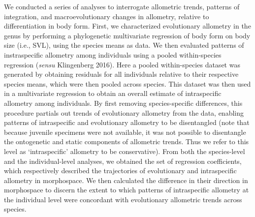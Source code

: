 \documentclass[
  11pt,
]{article}
\begin{document}
We conducted a series of analyses to interrogate allometric trends,
patterns of integration, and macroevolutionary changes in allometry,
relative to differentiation in body form. First, we characterized
evolutionary allometry in the genus by performing a phylogenetic
multivariate regression of body form on body size (i.e., SVL), using the
species means as data. We then evaluated patterns of instraspecific
allometry among individuals using a pooled within-species regression
(\emph{sensu} Klingenberg 2016). Here a pooled within-species dataset
was generated by obtaining residuals for all individuals relative to
their respective species means, which were then pooled across species.
This dataset was then used in a multivariate regression to obtain an
overall estimate of intraspecific allometry among individuals. By first
removing species-specific differences, this procedure partials out
trends of evolutionary allometry from the data, enabling patterns of
intraspecific and evolutionary allometry to be disentangled (note that
because juvenile specimens were not available, it was not possible to
disentangle the ontogenetic and static components of allometric trends.
Thus we refer to this level as `intraspecific' allometry to be
conservative). From both the species-level and the individual-level
analyses, we obtained the set of regression coefficients, which
respectively described the trajectories of evolutionary and
intraspecific allometry in morphospace. We then calculated the
difference in their direction in morphospace to discern the extent to
which patterns of intraspecific allometry at the individual level were
concordant with evolutionary allometric trends across species.
\hfill\break
\end{document}
